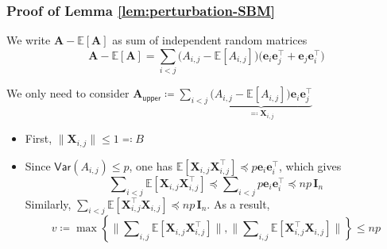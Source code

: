 \documentclass[compress,
mathserif,wide,%
]{beamer}
\begin{document}
%	
%	
%
	


\begin{frame}
\frametitle{Proof of Lemma \ref{lem:perturbation-SBM}}
We write $\bm{A}-\mathbb{E}[\bm{A}]$ as sum of independent random matrices
\[
\bm{A}-\mathbb{E}[\bm{A}] = \sum_{i < j} \big(A_{i,j}-\mathbb{E}[A_{i,j}]\big) \big ( \bm{e}_{i}\bm{e}_{j}^{\top} +\bm{e}_{j}\bm{e}_{i}^{\top} )
\]

We only need to consider $\bm{A}_{\mathsf{upper}} \coloneqq \sum_{  i < j} \underbrace{\big(A_{i,j}-\mathbb{E}[A_{i,j}]\big) \bm{e}_{i}\bm{e}_{j}^{\top}}_{\eqqcolon \bm{X}_{i,j}} $



\begin{itemize}
\itemsep0.5em
\item First, $\|\bm{X}_{i,j}\|\leq1 \eqqcolon B$
\item Since $\mathsf{Var}(A_{i,j})\leq p$, one has
$\mathbb{E}\left[\bm{X}_{i,j}\bm{X}_{i,j}^{\top}\right]\preceq p\bm{e}_{i}\bm{e}_{i}^{\top}$, which gives
%
\[
\sum\nolimits_{i < j}\mathbb{E}\left[\bm{X}_{i,j}\bm{X}_{i,j}^{\top}\right]\preceq\sum\nolimits_{i<j}p \bm{e}_{i}\bm{e}_{i}^{\top} \preceq np\,\bm{I}_{n}
\]
%
Similarly, $\sum_{i<j}\mathbb{E}\left[ \bm{X}_{i,j}^{\top} \bm{X}_{i,j} \right]\preceq np\,\bm{I}_{n}$.
As a result,
%
\[
v \coloneqq \max\left\{ \Big\|\sum\nolimits_{i,j}\mathbb{E}\left[\bm{X}_{i,j}\bm{X}_{i,j}^{\top}\right]\Big\|,\Big\|\sum\nolimits_{i,j}\mathbb{E}\left[\bm{X}_{i,j}^{\top}\bm{X}_{i,j}\right]\Big\|\right\} \leq np
\]
%


%
\end{itemize}
%
%




\end{frame}
\end{document}
